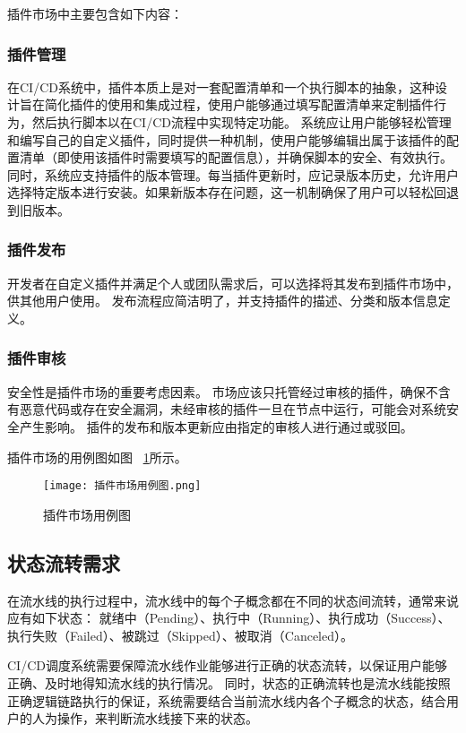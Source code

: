 插件市场中主要包含如下内容：

\subsubsection{插件管理}
在CI/CD系统中，插件本质上是对一套配置清单和一个执行脚本的抽象，这种设计旨在简化插件的使用和集成过程，使用户能够通过填写配置清单来定制插件行为，然后执行脚本以在CI/CD流程中实现特定功能。
系统应让用户能够轻松管理和编写自己的自定义插件，同时提供一种机制，使用户能够编辑出属于该插件的配置清单（即使用该插件时需要填写的配置信息），并确保脚本的安全、有效执行。
同时，系统应支持插件的版本管理。每当插件更新时，应记录版本历史，允许用户选择特定版本进行安装。如果新版本存在问题，这一机制确保了用户可以轻松回退到旧版本。

\subsubsection{插件发布}
开发者在自定义插件并满足个人或团队需求后，可以选择将其发布到插件市场中，供其他用户使用。
发布流程应简洁明了，并支持插件的描述、分类和版本信息定义。

\subsubsection{插件审核}
安全性是插件市场的重要考虑因素。
市场应该只托管经过审核的插件，确保不含有恶意代码或存在安全漏洞，未经审核的插件一旦在节点中运行，可能会对系统安全产生影响。
插件的发布和版本更新应由指定的审核人进行通过或驳回。

插件市场的用例图如图~ \ref{fig:插件市场用例图}所示。

\begin{figure}[h]
  \centering
  \texttt{[image: 插件市场用例图.png]}
  \caption{插件市场用例图}
  \label{fig:插件市场用例图}
\end{figure}

\subsection{状态流转需求}
在流水线的执行过程中，流水线中的每个子概念都在不同的状态间流转，通常来说应有如下状态：
就绪中（Pending）、执行中（Running）、执行成功（Success）、执行失败（Failed）、被跳过（Skipped）、被取消（Canceled）。

CI/CD调度系统需要保障流水线作业能够进行正确的状态流转，以保证用户能够正确、及时地得知流水线的执行情况。
同时，状态的正确流转也是流水线能按照正确逻辑链路执行的保证，系统需要结合当前流水线内各个子概念的状态，结合用户的人为操作，来判断流水线接下来的状态。

